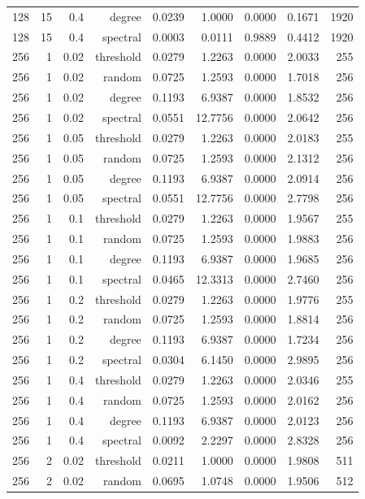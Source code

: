 \begin{table}[t]
\begin{tabular}{lrrrrrrrr}
128 & 15 & 0.4 & degree & 0.0239 & 1.0000 & 0.0000 & 0.1671 & 1920 \\
128 & 15 & 0.4 & spectral & 0.0003 & 0.0111 & 0.9889 & 0.4412 & 1920 \\
256 & 1 & 0.02 & threshold & 0.0279 & 1.2263 & 0.0000 & 2.0033 & 255 \\
256 & 1 & 0.02 & random & 0.0725 & 1.2593 & 0.0000 & 1.7018 & 256 \\
256 & 1 & 0.02 & degree & 0.1193 & 6.9387 & 0.0000 & 1.8532 & 256 \\
256 & 1 & 0.02 & spectral & 0.0551 & 12.7756 & 0.0000 & 2.0642 & 256 \\
256 & 1 & 0.05 & threshold & 0.0279 & 1.2263 & 0.0000 & 2.0183 & 255 \\
256 & 1 & 0.05 & random & 0.0725 & 1.2593 & 0.0000 & 2.1312 & 256 \\
256 & 1 & 0.05 & degree & 0.1193 & 6.9387 & 0.0000 & 2.0914 & 256 \\
256 & 1 & 0.05 & spectral & 0.0551 & 12.7756 & 0.0000 & 2.7798 & 256 \\
256 & 1 & 0.1 & threshold & 0.0279 & 1.2263 & 0.0000 & 1.9567 & 255 \\
256 & 1 & 0.1 & random & 0.0725 & 1.2593 & 0.0000 & 1.9883 & 256 \\
256 & 1 & 0.1 & degree & 0.1193 & 6.9387 & 0.0000 & 1.9685 & 256 \\
256 & 1 & 0.1 & spectral & 0.0465 & 12.3313 & 0.0000 & 2.7460 & 256 \\
256 & 1 & 0.2 & threshold & 0.0279 & 1.2263 & 0.0000 & 1.9776 & 255 \\
256 & 1 & 0.2 & random & 0.0725 & 1.2593 & 0.0000 & 1.8814 & 256 \\
256 & 1 & 0.2 & degree & 0.1193 & 6.9387 & 0.0000 & 1.7234 & 256 \\
256 & 1 & 0.2 & spectral & 0.0304 & 6.1450 & 0.0000 & 2.9895 & 256 \\
256 & 1 & 0.4 & threshold & 0.0279 & 1.2263 & 0.0000 & 2.0346 & 255 \\
256 & 1 & 0.4 & random & 0.0725 & 1.2593 & 0.0000 & 2.0162 & 256 \\
256 & 1 & 0.4 & degree & 0.1193 & 6.9387 & 0.0000 & 2.0123 & 256 \\
256 & 1 & 0.4 & spectral & 0.0092 & 2.2297 & 0.0000 & 2.8328 & 256 \\
256 & 2 & 0.02 & threshold & 0.0211 & 1.0000 & 0.0000 & 1.9808 & 511 \\
256 & 2 & 0.02 & random & 0.0695 & 1.0748 & 0.0000 & 1.9506 & 512 \\

\end{tabular}
\end{table}
